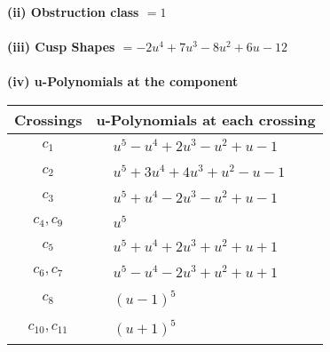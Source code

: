 \documentclass[1p]{elsarticle_modified}
\theoremstyle{definition}
\begin{document}
\flushleft \textbf{(ii) Obstruction class $= 1$}\\~\\
\flushleft \textbf{(iii) Cusp Shapes $= -2 u^4+7 u^3-8 u^2+6 u-12$}\\~\\
\newpage\renewcommand{\arraystretch}{1}
\flushleft \textbf{(iv) u-Polynomials at the component}\newline \\
\begin{tabular}{m{50pt}|m{274pt}}
Crossings & \hspace{64pt}u-Polynomials at each crossing \\
\hline $$\begin{aligned}c_{1}\end{aligned}$$&$\begin{aligned}
&u^5- u^4+2 u^3- u^2+u-1
\end{aligned}$\\
\hline $$\begin{aligned}c_{2}\end{aligned}$$&$\begin{aligned}
&u^5+3 u^4+4 u^3+u^2- u-1
\end{aligned}$\\
\hline $$\begin{aligned}c_{3}\end{aligned}$$&$\begin{aligned}
&u^5+u^4-2 u^3- u^2+u-1
\end{aligned}$\\
\hline $$\begin{aligned}c_{4},c_{9}\end{aligned}$$&$\begin{aligned}
&u^5
\end{aligned}$\\
\hline $$\begin{aligned}c_{5}\end{aligned}$$&$\begin{aligned}
&u^5+u^4+2 u^3+u^2+u+1
\end{aligned}$\\
\hline $$\begin{aligned}c_{6},c_{7}\end{aligned}$$&$\begin{aligned}
&u^5- u^4-2 u^3+u^2+u+1
\end{aligned}$\\
\hline $$\begin{aligned}c_{8}\end{aligned}$$&$\begin{aligned}
&(u-1)^5
\end{aligned}$\\
\hline $$\begin{aligned}c_{10},c_{11}\end{aligned}$$&$\begin{aligned}
&(u+1)^5
\end{aligned}$\\
\hline
\end{tabular}\\~\\
\end{document}
